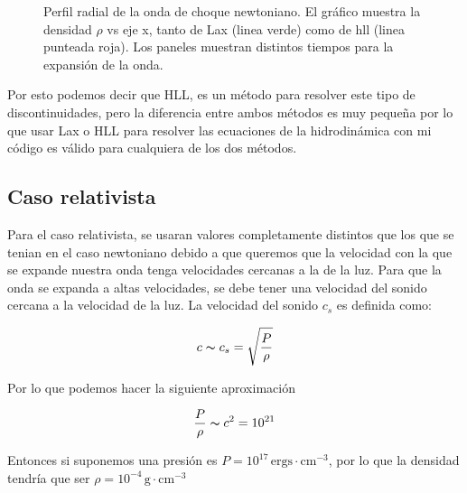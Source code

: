 \documentclass[12pt,a4paper]{book}
\begin{document}
\begin{figure}
\caption{\label{fig:Perfil_radial_newtoniano}Perfil radial de la onda de choque newtoniano. El gráfico muestra la densidad $\rho$ vs eje x, tanto de Lax (linea verde) como de hll (linea punteada roja). Los paneles muestran distintos tiempos para la expansión de la onda.}  
\end{figure}



Por esto podemos decir que HLL, es un método para resolver este tipo de discontinuidades, pero la diferencia entre ambos métodos es muy pequeña por lo que usar Lax o HLL para resolver las ecuaciones de la hidrodinámica con mi código es válido para cualquiera de los dos métodos.


\subsection{Caso relativista} 


Para el caso relativista, se usaran valores completamente distintos que los que se tenian en el caso newtoniano debido a que queremos que la velocidad con la que se expande nuestra onda tenga velocidades cercanas a la de la luz. Para que la onda se expanda a altas velocidades, se debe tener una velocidad del sonido cercana a la velocidad de la luz. La velocidad del sonido $c_s$ es definida como:



\begin{equation}
c \thicksim c_s = \sqrt{\frac{P}{\rho}}
\end{equation}

Por lo que podemos hacer la siguiente aproximación

\begin{equation}
\frac{P}{\rho} \thicksim c^2 = 10^{21}
\end{equation}

Entonces si suponemos una presión es $P = 10^{17} \, \mathrm{ergs} \cdot \mathrm{cm}^{-3}$, por lo que la densidad tendría que ser $\rho = 10^{-4} \, \mathrm{g}\cdot \mathrm{cm}^{-3}$
\end{document}
